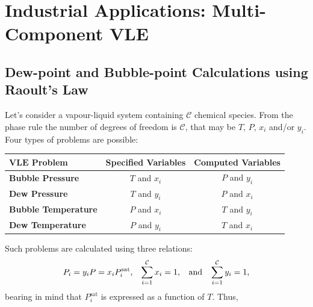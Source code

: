   \section{Industrial Applications: Multi-Component VLE}\label{Chapter:VLE:Section:IndApplications}
  
\subsection{Dew-point and Bubble-point Calculations using Raoult’s Law }\label{Chapter:VLE:Section:DewBubblePoint}
Let's consider a vapour-liquid system containing $\mathcal{C}$ chemical species. From the phase rule the number of degrees of freedom is $\mathcal{C}$, that may be $T$, $P$, $x_{i}$ and/or $y_{i}$. Four types of problems are possible:
\begin{center}
   \begin{tabular}{|l c c|}
      \hline 
      $\mathbf{VLE}$ {\bf Problem} & {\bf Specified Variables} &  {\bf Computed Variables} \\  
      \hline
          {\bf Bubble Pressure}        &  $T$ and $x_{i}$           &   $P$ and $y_{i}$          \\
          {\bf Dew Pressure}           &  $T$ and $y_{i}$           &   $P$ and $x_{i}$          \\
          {\bf Bubble Temperature}     &  $P$ and $x_{i}$           &   $T$ and $y_{i}$          \\
          {\bf Dew Temperature}        &  $P$ and $y_{i}$           &   $T$ and $x_{i}$          \\     
      \hline
   \end{tabular}
\end{center}
Such problems are calculated using three relations:
\begin{displaymath}
    P_{i} = y_{i}P = x_{i}P_{i}^{\text{sat}}, \;\;\; \summation[x_{i}]{i=1}{\mathcal{C}} = 1, \;\;\text{ and }\;\; \summation[y_{i}]{i=1}{\mathcal{C}} = 1,
\end{displaymath}
bearing in mind that $P_{i}^{\text{sat}}$ is expressed as a function of $T$. Thus,
